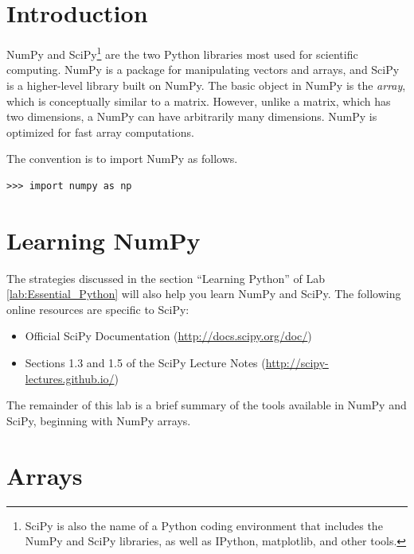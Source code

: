 \label{lab:NumPyArrays}

\section*{Introduction}

NumPy and SciPy\footnote{SciPy is also the name of a Python coding environment that includes the NumPy and SciPy libraries, as well as IPython, matplotlib, and other tools.} 
are the two Python libraries most used for scientific computing. 
NumPy is a package for manipulating vectors and arrays, and SciPy is a higher-level library built on NumPy. 
The basic object in NumPy is the \emph{array}, which is conceptually similar to a matrix. 
However, unlike a matrix, which has two dimensions, a NumPy  can have arbitrarily many dimensions. 
NumPy is optimized for fast array computations.

The convention is to import NumPy as follows.

\begin{lstlisting}
>>> import numpy as np
\end{lstlisting}

\section*{Learning NumPy}
The strategies discussed in the section ``Learning Python'' of Lab \ref{lab:Essential_Python} will also help you learn NumPy and SciPy. 
The following online resources are specific to SciPy:
\begin{itemize}
\item Official SciPy Documentation (\url{http://docs.scipy.org/doc/})
\item Sections 1.3 and 1.5 of the SciPy Lecture Notes (\url{http://scipy-lectures.github.io/})
\end{itemize}
The remainder of this lab is a brief summary of the tools available in NumPy and SciPy, beginning with NumPy arrays.


\section*{Arrays}


